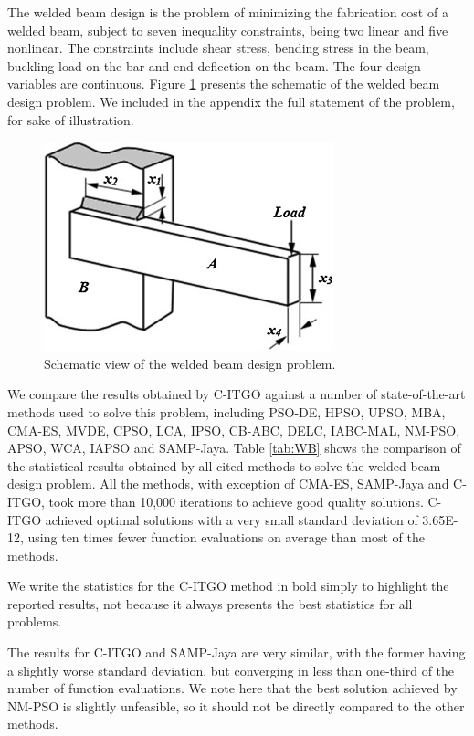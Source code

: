 The welded beam design \citep{WB} is the problem of minimizing the fabrication cost of a welded beam, subject to seven inequality constraints, being two linear and five nonlinear. The constraints include shear stress, bending stress in the beam, buckling load on the bar and end deflection on the beam. The four design variables are continuous. Figure \ref{fig:WB} presents the schematic of the welded beam design problem. We included in the appendix the full statement of the problem, for sake of illustration.

\begin{figure}[h]
\begin{center}
\includegraphics[scale=0.7]{Imgs/WB.jpg}
\end{center}
\captionsetup{justification=centering}
\caption{Schematic view of the welded beam design problem.}\label{fig:WB}
\end{figure}

We compare the results obtained by C-ITGO against a number of state-of-the-art methods used to solve this problem, including PSO-DE, HPSO, UPSO, MBA, CMA-ES, MVDE, CPSO, LCA, IPSO, CB-ABC, DELC, IABC-MAL, NM-PSO, APSO, WCA, IAPSO and SAMP-Jaya. Table \ref{tab:WB} shows the comparison of the statistical results obtained by all cited methods to solve the welded beam design problem. All the methods, with exception of CMA-ES, SAMP-Jaya and C-ITGO, took more than 10,000 iterations to achieve good quality solutions. C-ITGO achieved optimal solutions with a very small standard deviation of 3.65E-12, using ten times fewer function evaluations on average than most of the methods.

We write the statistics for the C-ITGO method in bold simply to highlight the reported results, not because it always presents the best statistics for all problems.



The results for C-ITGO and SAMP-Jaya are very similar, with the former having a slightly worse standard deviation, but converging in less than one-third of the number of function evaluations. We note here that the best solution achieved by NM-PSO is slightly unfeasible, so it should not be directly compared to the other methods.




